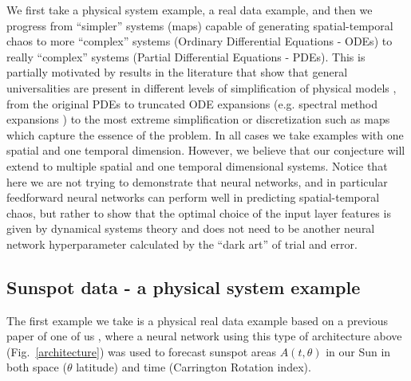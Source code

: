 \documentclass[journal]{IEEEtran}
\begin{document}
We first take a physical system example, a real data example, and then we progress from ``simpler'' systems (maps) capable of generating 
spatial-temporal chaos to more ``complex'' systems (Ordinary Differential Equations - ODEs) to really ``complex'' systems (Partial 
Differential Equations - PDEs). This is partially motivated by results in the literature that show that general universalities are 
present in different levels of simplification of physical models \cite{2001Chaos..11..404C}, 
from the original PDEs to truncated ODE expansions (e.g. spectral 
method expansions \cite{2001cfsm.book.....B}) to the most extreme simplification or discretization such as maps 
which capture the essence of the problem. In all cases we take examples with one spatial and one temporal dimension. However, we believe 
that our conjecture will extend to multiple spatial and one temporal dimensional systems. Notice that here we are not trying to demonstrate
that neural networks, and in particular feedforward neural networks can perform well in predicting spatial-temporal chaos, but 
rather to show that the optimal choice of the input layer features is given by dynamical systems theory and does not need to be
another neural network hyperparameter calculated by the ``dark art'' of trial and error.

\subsection{Sunspot data - a physical system example}


The first example we take is a physical real data example based on a previous paper of one of us \cite{covaspeixinhojoao}, where a 
neural network using this type of architecture above (Fig.\ \ref{architecture}) was used to forecast sunspot areas $A(t,\theta)$ in our 
Sun in both space ($\theta$ latitude) and time (Carrington Rotation index). 
\end{document}
